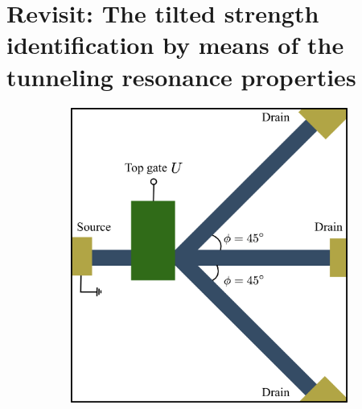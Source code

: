 \section{Revisit: The tilted strength identification by means of the tunneling resonance properties} \label{sec:find w 2}
    \begin{figure}[H] 
        \centering
        \begin{subfigure}[b]{0.45\linewidth}
            \includegraphics[width=\linewidth]{fig/3 arm structure.png}
            \caption{}
            \label{fig:3 arms}
        \end{subfigure}
        \begin{subfigure}[b]{0.3\linewidth}

\end{subfigure}
\end{figure}
